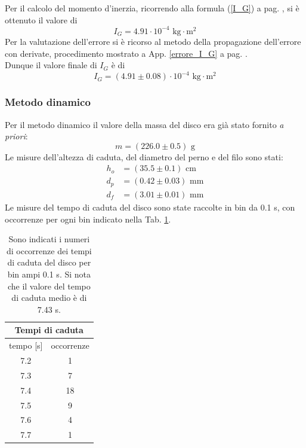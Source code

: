 Per il calcolo del momento d'inerzia, ricorrendo alla formula (\ref{I_G}) a pag. \pageref{I_G}, si è ottenuto il valore di 
$$I_G = 4.91 \cdot 10^{-4} \textrm{ kg} \cdot \textrm{m}^2$$
Per la valutazione dell'errore si è ricorso al metodo della propagazione dell'errore con derivate, procedimento mostrato a App. \ref{errore_I_G} a pag. \pageref{errore_I_G}.\\
Dunque il valore finale di $I_G$ è di
$$I_G = (4.91 \pm 0.08) \cdot 10^{-4} \textrm{ kg} \cdot \textrm{m}^2$$

\subsubsection*{Metodo dinamico}
Per il metodo dinamico il valore della massa del disco era già stato fornito \textit{a priori}: 
$$m = (226.0 \pm 0.5) \textrm{ g}$$
Le misure dell'altezza di caduta, del diametro del perno e del filo sono stati:
\begin{align*}
    h_o &= (35.5 \pm 0.1) \textrm{ cm} \\
    d_p &= (0.42 \pm 0.03) \textrm{ mm} \\
    d_f &= (3.01 \pm 0.01) \textrm{ mm}
\end{align*}
Le misure del tempo di caduta del disco sono state raccolte in bin da 0.1 s, con occorrenze per ogni bin indicato nella Tab. \ref{tab_tempi_di_caduta_2}.
\begin{table}[htp]
    \begin{center}
        \begin{tabular}{||c|c||}
            \hline
            \hline
            \multicolumn{2}{||c||}{Tempi di caduta}\\
            \hline \hline
            tempo [s] & occorrenze \\
            \hline
            7.2 & 1\\
            7.3 & 7\\
            7.4 & 18\\
            7.5 & 9\\
            7.6 & 4\\
            7.7 & 1\\
            \hline
            \hline
        \end{tabular}
    \end{center}
    \caption[\small Tabella di tempi di caduta - occorrenze.]{\small Sono indicati i numeri di occorrenze dei tempi di caduta del disco per bin ampi 0.1 s. Si nota che il valore del tempo di caduta medio è di 7.43 s.}
    \label{tab_tempi_di_caduta_2}
\end{table}\\
